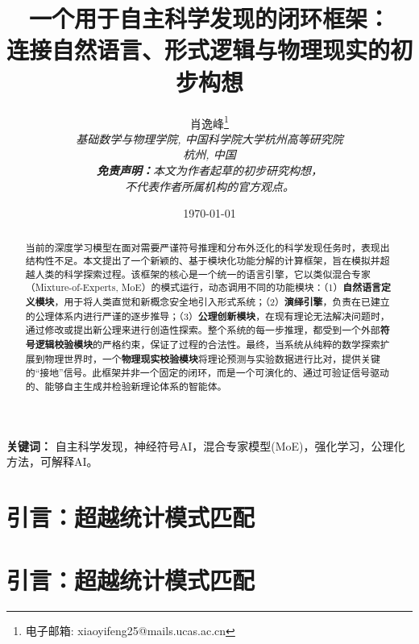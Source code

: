 \documentclass[11pt, a4paper]{article}
\begin{document}
	
	\title{\textbf{一个用于自主科学发现的闭环框架：\\连接自然语言、形式逻辑与物理现实的初步构想}}
	\author{
		肖逸峰\thanks{电子邮箱: xiaoyifeng25@mails.ucas.ac.cn} \\
		\textit{\small 基础数学与物理学院, 中国科学院大学杭州高等研究院}\\
		\textit{\small 杭州, 中国}\\
		\vspace{1em}
		\textit{\small \textbf{免责声明：}本文为作者起草的初步研究构想，} \\
		\textit{\small 不代表作者所属机构的官方观点。}
	}
	\date{\today} %
	
	\maketitle %
	
\begin{abstract}
	当前的深度学习模型在面对需要严谨符号推理和分布外泛化的科学发现任务时，表现出结构性不足。本文提出了一个新颖的、基于模块化功能分解的计算框架，旨在模拟并超越人类的科学探索过程。该框架的核心是一个统一的语言引擎，它以类似混合专家（Mixture-of-Experts, MoE）的模式运行，动态调用不同的功能模块：（1）\textbf{自然语言定义模块}，用于将人类直觉和新概念安全地引入形式系统；（2）\textbf{演绎引擎}，负责在已建立的公理体系内进行严谨的逐步推导；（3）\textbf{公理创新模块}，在现有理论无法解决问题时，通过修改或提出新公理来进行创造性探索。整个系统的每一步推理，都受到一个外部\textbf{符号逻辑校验模块}的严格约束，保证了过程的合法性。最终，当系统从纯粹的数学探索扩展到物理世界时，一个\textbf{物理现实校验模块}将理论预测与实验数据进行比对，提供关键的“接地”信号。此框架并非一个固定的闭环，而是一个可演化的、通过可验证信号驱动的、能够自主生成并检验新理论体系的智能体。
\end{abstract}

\noindent\textbf{关键词：} 自主科学发现，神经符号AI，混合专家模型(MoE)，强化学习，公理化方法，可解释AI。

\vspace{2em}


\section{引言：超越统计模式匹配}

\section{引言：超越统计模式匹配}
\end{document}
